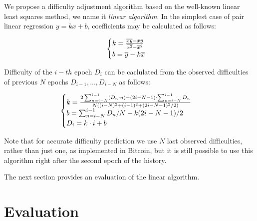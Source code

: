 \documentclass[]{llncs}
\newcommand*\mean[1]{\bar{#1}}
\newcommand*\widemean[1]{\overline{#1}}
\begin{document}

We propose a difficulty adjustment algorithm based on the well-known linear least squares method\cite{lawson1974solving}, we name it {\em linear algorithm}. In the simplest case of pair linear regression $y=kx+b$, coefficients may be calculated as follows:

\begin{equation}
  \begin{cases}
    k= {{\widemean{xy} - \mean{x} \mean{y}} \over {\widemean{x^2} - \widemean{x}^2}}  \\
    b= \widemean{y}-k\widemean{x}
  \end{cases}
\end{equation}

Difficulty of the $i-th$ epoch $D_i$ can be caclulated from the observed difficulties of previous $N$ epochs $D_{i-1},...,D_{i-N}$ as follows:

\begin{equation}
  \begin{cases}
    k= {2\sum_{n=i-N}^{i-1} (D_n \cdot n) - (2i-N-1)\cdot \sum_{n=i-N}^{i-1} D_n \over N ( (i-N)^2 + (i-1)^2 + (2i-N-1)^2/2 )} \\
    b= \sum_{n=i-N}^{i-1} D_n / N-k (2i-N-1)/2 \\
    D_i= k \cdot i + b
  \end{cases}
\end{equation}

Note that for accurate difficulty prediction we use $N$ last observed difficulties, rather than just one, as implemented in Bitcoin, but it is still possible to use this algorithm right after the second epoch of the history.

The next section provides an evaluation of the linear algorithm.

\section{Evaluation}
\label{sec:sim}
\end{document}
